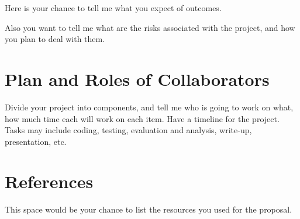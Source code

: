 \documentclass[conference]{sig-alternate-05-2015}
\begin{document}
Here is your chance to tell me what you expect of outcomes. 

Also you want to tell me what are the risks associated with the project, and how you plan to deal with them. 

\section{Plan and Roles of Collaborators}
Divide your project into components, and tell me who is going to work on what, how much time each will work on each item. Have a timeline for the project. Tasks may include coding, testing, evaluation and analysis, write-up, presentation, etc. 


\section{References}\label{sec:conclusion}
This space would be your chance to list the resources you used for the proposal. 



\end{document}

